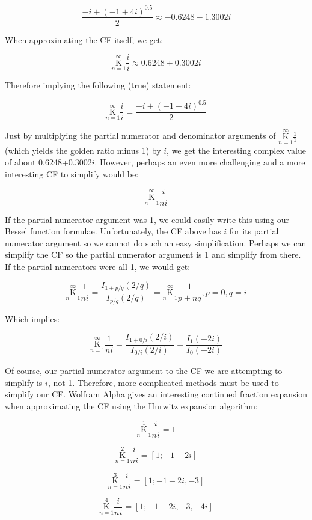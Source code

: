 \documentclass{article}
\begin{document}
$$\frac{-i + (-1+4i)^{0.5}}{2} \approx -0.6248 - 1.3002i$$

When approximating the CF itself, we get:

$$\underset{n=1}{\overset{\infty}{ \mathrm K}} \frac{i}{i} \approx 0.6248 + 0.3002i$$

Therefore implying the following (true) statement:

$$\underset{n=1}{\overset{\infty}{ \mathrm K}} \frac{i}{i} = \frac{-i + (-1+4i)^{0.5}}{2}$$

Just by multiplying the partial numerator and denominator arguments of $\underset{n=1}{\overset{\infty}{ \mathrm K}} \frac{1}{1}$ (which yields the golden ratio minus 1) by $i$, we get the interesting complex value of about 0.6248+0.3002$i$. However, perhaps an even more challenging and a more interesting CF to simplify would be:

$$\underset{n=1}{\overset{\infty}{ \mathrm K}} \frac{i}{ni}$$

If the partial numerator argument was 1, we could easily write this using our Bessel function formulae. Unfortunately, the CF above has $i$ for its partial numerator argument so we cannot do such an easy simplification. Perhaps we can simplify the CF so the partial numerator argument is 1 and simplify from there. If the partial numerators were all 1, we would get:

$$\underset{n=1}{\overset{\infty}{ \mathrm K}} \frac{1}{ni}=\frac{I_{1+p/q}(2/q)}{I_{p/q}(2/q)}=\underset{n=1}{\overset{\infty}{\mathrm K}} \frac{1}{p+nq}, p=0,q=i$$

Which implies:

$$\underset{n=1}{\overset{\infty}{ \mathrm K}} \frac{1}{ni}=\frac{I_{1+0/i}(2/i)}{I_{0/i}(2/i)}=\frac{I_{1}(-2i)}{I_{0}(-2i)}$$

Of course, our partial numerator argument to the CF we are attempting to simplify is $i$, not 1. Therefore, more complicated methods must be used to simplify our CF. Wolfram Alpha gives an interesting continued fraction expansion when approximating the CF using the Hurwitz expansion algorithm:

$$\underset{n=1}{\overset{1}{ \mathrm K}} \frac{i}{ni}=1$$

$$\underset{n=1}{\overset{2}{ \mathrm K}} \frac{i}{ni}=[1;-1-2i]$$

$$\underset{n=1}{\overset{3}{ \mathrm K}} \frac{i}{ni}=[1;-1-2i,-3]$$

$$\underset{n=1}{\overset{4}{ \mathrm K}} \frac{i}{ni}=[1;-1-2i,-3,-4i]$$
\end{document}

